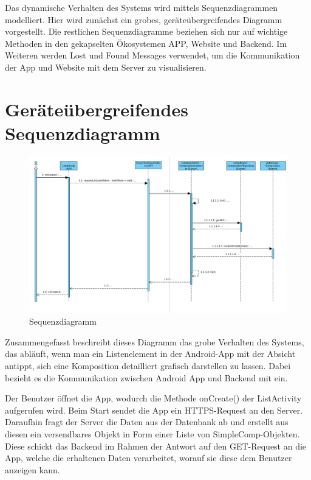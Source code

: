 	Das dynamische Verhalten des Systems wird mittels Sequenzdiagrammen modelliert.
	Hier wird zunächst ein grobes, geräteübergreifendes Diagramm vorgestellt.
	Die restlichen Sequenzdiagramme beziehen sich nur auf wichtige Methoden in den gekapselten Ökosystemen APP, Website und Backend. Im Weiteren werden Lost und Found Messages verwendet, um die Kommunikation der App und Website mit dem Server zu visualisieren. 
	
\section*{Geräteübergreifendes Sequenzdiagramm}

\begin{figure}[h]
	\centering
	\includegraphics[width=\textwidth]{img/Diagramme/Sequenz/Overview}
	\caption{Sequenzdiagramm}
	\label{fig:sequenz-overview}
\end{figure}
\noindent
Zusammengefasst beschreibt dieses Diagramm das grobe Verhalten des Systems, das abläuft, wenn man ein Listenelement in der Android-App mit der Absicht antippt, sich eine Komposition detailliert grafisch darstellen zu lassen. Dabei bezieht es die Kommunikation zwischen Android App und Backend mit ein.\newline

\noindent Der Benutzer öffnet die App, wodurch die Methode onCreate() der ListActivity aufgerufen wird. Beim Start sendet die App ein HTTPS-Request an den Server. Daraufhin fragt der Server die Daten aus der Datenbank ab und erstellt aus diesen ein versendbares Objekt in Form einer Liste von SimpleComp-Objekten. Diese schickt das Backend im Rahmen der Antwort auf den GET-Request an die App, welche die erhaltenen Daten verarbeitet, worauf sie diese dem Benutzer anzeigen kann.

